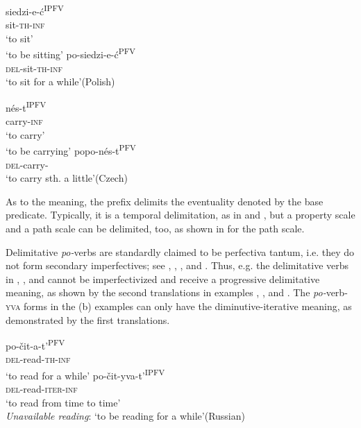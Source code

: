 \documentclass[output=paper,colorlinks,citecolor=brown]{langscibook}
\begin{document}
\ea\label{biskup:ex:del-pol}\ea\gll siedzi-e-ć\textsuperscript{IPFV}\\
sit-\textsc{th-inf}\\
\glt ‘to sit’\\‘to be sitting’\label{biskup:ex:del-pol.a}
\ex\gll po-siedzi-e-ć\textsuperscript{PFV}\\
\textsc{del}-sit-\textsc{th-inf}\\
\glt ‘to sit for a while’\hfill(Polish)\label{biskup:ex:del-pol.b}
\z\z

\ea\label{biskup:ex:del-cz}\ea\gll nés-t\textsuperscript{IPFV}\\
carry-\textsc{inf}\\
\glt ‘to carry’\\‘to be carrying’\label{biskup:ex:del.cz.a}
\ex\gll popo-nés-t\textsuperscript{PFV}\\
\textsc{del}-carry-\INF\\
\glt ‘to carry sth. a little’\hfill(Czech)\label{biskup:ex:del-cz.b}
\z\z

\noindent As to the meaning, the prefix delimits the eventuality denoted by the base predicate. Typically, it is a temporal delimitation, as in  and , but a property scale and a path scale can be delimited, too, as shown in  for the path scale.

Delimitative \textit{po-}verbs are standardly claimed to be perfectiva tantum, i.e. they do not form secondary imperfectives; see \citet[391]{Isačenko1962}, \citet[110]{Kopecny1962}, \citet[94]{Zaliznjak.Smelev1997}, and \citet[77]{Lazinski2020}. Thus, e.g. the delimitative verbs in , , and  cannot be imperfectivized and receive a progressive delimitative meaning, as shown by the second translations in examples , , and . The \textit{po-}verb-\textsc{yva} forms in the (b) examples can only have the diminutive-iterative meaning, as demonstrated by the first translations.

\ea\label{biskup:ex:del2-rus}\ea\gll po-čit-a-t'\textsuperscript{PFV}\\
\textsc{del}-read-\textsc{th-inf}\\
\glt ‘to read for a while’ \label{biskup:ex:del2-rus.a}
\ex\gll po-čit-yva-t'\textsuperscript{IPFV}\\
\textsc{del}-read-\textsc{iter-inf}\\
\glt ‘to read from time to time’\\ \textit{Unavailable reading}: `to be reading for a while'\hfill(Russian)\label{biskup:ex:del2-rus.b}
\z\z
\end{document}
